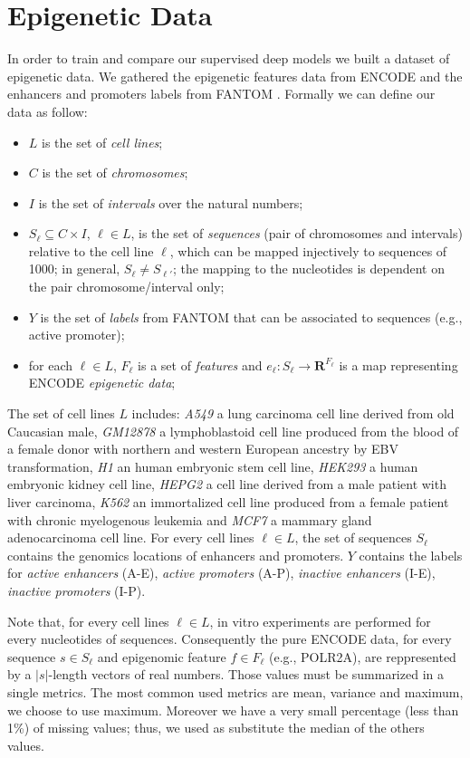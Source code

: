 \section{Epigenetic Data}
In order to train and compare our supervised deep models we built a dataset of epigenetic data. We gathered the epigenetic features data from ENCODE \cite{ENCODE_data} and the enhancers and promoters labels from FANTOM \cite{FANTOM_data}. Formally we can define our data as follow: 
\begin{itemize}
    \item $L$ is the set of \emph{cell lines};
    \item $C$ is the set of \emph{chromosomes};
    \item $I$ is the set of \emph{intervals} over the natural numbers;
    \item $S_\ell\subseteq C\times I$, $\ell\in L$, is the set of \emph{sequences} (pair of chromosomes and intervals) relative to the cell line $\ell$, which can be mapped injectively to sequences of 1000; in general, $S_\ell\neq S_{\ell'}$; the mapping to the nucleotides is dependent on the pair chromosome/interval only;
    \item $Y$ is the set of \emph{labels} from FANTOM that can be associated to sequences (e.g., active promoter);
    \item for each $\ell\in L$, $F_\ell$ is a set of \emph{features} and $e_\ell:S_\ell\to\mathbf R^{F_\ell}$ is a map representing ENCODE \emph{epigenetic data};
\end{itemize}
The set of cell lines $L$ includes: \emph{A549} a lung carcinoma cell line derived from old Caucasian male, \emph{GM12878} a lymphoblastoid cell line produced from the blood of a female donor with northern and western European ancestry by EBV transformation, \emph{H1} an human embryonic stem cell line, \emph{HEK293} a human embryonic kidney cell line, \emph{HEPG2} a cell line derived from a male patient with liver carcinoma, \emph{K562} an immortalized cell line produced from a female patient with chronic myelogenous leukemia and \emph{MCF7} a mammary gland adenocarcinoma cell line. For every cell lines $\ell \in L$, the set of sequences $S_\ell$ contains the genomics locations of enhancers and promoters. $Y$ contains the labels for \emph{active enhancers} (A-E), \emph{active promoters} (A-P), \emph{inactive enhancers} (I-E), \emph{inactive promoters} (I-P).

Note that, for every cell lines $\ell \in L$, in vitro experiments are
performed for every nucleotides of sequences. Consequently the pure ENCODE
data, for every sequence $s \in S_\ell$ and epigenomic feature $f \in
F_\ell$ (e.g., POLR2A), are reppresented by a $|s|$-length vectors of real
numbers. Those values must be summarized in a single metrics. The most
common used metrics are mean, variance and maximum, we choose to use
maximum. Moreover we have a very small percentage (less than 1\%) of
missing values; thus, we used as substitute the median of the others
values.


